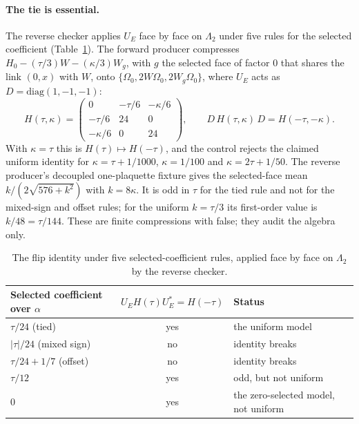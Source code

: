 \paragraph{The tie is essential.}
The reverse checker applies $U_E$ face by face on $\Lambda_2$ under five
rules for the selected coefficient (Table~\ref{tab:ax1-tie}). The forward
producer compresses $H_0-(\tau/3)W-(\kappa/3)W_g$, with $g$ the selected face
of factor $0$ that shares the link $(0,x)$ with $W$, onto
$\{\Omega_0,2W\Omega_0,2W_g\Omega_0\}$, where $U_E$ acts as
$D=\mathrm{diag}(1,-1,-1)$:
\begin{equation}
 H(\tau,\kappa)=\begin{pmatrix}0&-\tau/6&-\kappa/6\\ -\tau/6&24&0\\
 -\kappa/6&0&24\end{pmatrix},\qquad
 D\,H(\tau,\kappa)\,D=H(-\tau,-\kappa).
 \label{eq:ax1-compression}
\end{equation}
With $\kappa=\tau$ this is
$H(\tau)\mapsto H(-\tau)$, and the control 
rejects the claimed uniform identity for $\kappa=\tau+1/1000$, $\kappa=1/100$
and $\kappa=2\tau+1/50$. The reverse producer's decoupled one-plaquette
fixture gives the selected-face mean $k/(2\sqrt{576+k^2})$ with $k=8\kappa$.
It is odd in $\tau$ for the tied rule and not for the mixed-sign and offset
rules; for the uniform $k=\tau/3$ its first-order value is $k/48=\tau/144$.
These are finite compressions with  false; they audit
the algebra only.

\begin{table}[htbp]
\centering\small
\caption{The flip identity under five selected-coefficient rules, applied face
by face on $\Lambda_2$ by the reverse checker.}
\label{tab:ax1-tie}
\begin{tabular}{lcl}
\toprule
Selected coefficient over $\alpha$ & $U_EH(\tau)U_E^*=H(-\tau)$ & Status\\
\midrule
$\tau/24$ (tied) & yes & the uniform model\\
$|\tau|/24$ (mixed sign) & no & identity breaks\\
$\tau/24+1/7$ (offset) & no & identity breaks\\
$\tau/12$ & yes & odd, but not uniform\\
$0$ & yes & the zero-selected model, not uniform\\
\bottomrule
\end{tabular}
\end{table}

